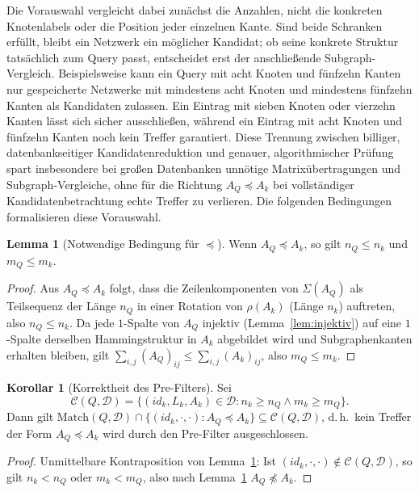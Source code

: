 \documentclass[a4paper,12pt, twoside]{report}
\theoremstyle{definition}
\newtheorem{lemma}{Lemma}
\newtheorem{korollar}{Korollar}
\begin{document}
Die Vorauswahl vergleicht dabei zunächst die Anzahlen, nicht die konkreten Knotenlabels oder die Position jeder einzelnen Kante. Sind beide Schranken erfüllt, bleibt ein Netzwerk ein möglicher Kandidat; ob seine konkrete Struktur tatsächlich zum Query passt, entscheidet erst der anschließende Subgraph-Vergleich. Beispielsweise kann ein Query mit acht Knoten und fünfzehn Kanten nur gespeicherte Netzwerke mit mindestens acht Knoten und mindestens fünfzehn Kanten als Kandidaten zulassen. Ein Eintrag mit sieben Knoten oder vierzehn Kanten lässt sich sicher ausschließen, während ein Eintrag mit acht Knoten und fünfzehn Kanten noch kein Treffer garantiert. Diese Trennung zwischen billiger, datenbankseitiger Kandidatenreduktion und genauer, algorithmischer Prüfung spart insbesondere bei großen Datenbanken unnötige Matrixübertragungen und Subgraph-Vergleiche, ohne für die Richtung $A_Q \preceq A_k$ bei vollständiger Kandidatenbetrachtung echte Treffer zu verlieren. Die folgenden Bedingungen formalisieren diese Vorauswahl.

\begin{lemma}[Notwendige Bedingung für $\preceq$]
	\label{lem:notwendig}
	Wenn $A_Q \preceq A_k$, so gilt $n_Q \le n_k$ und $m_Q \le m_k$.
\end{lemma}

\begin{proof}
	Aus $A_Q \preceq A_k$ folgt, dass die Zeilenkomponenten von $\Sigma(A_Q)$ als Teilsequenz der Länge $n_Q$ in einer Rotation von $\rho(A_k)$ (Länge $n_k$) auftreten, also $n_Q \le n_k$. Da jede $1$-Spalte von $A_Q$ injektiv (Lemma~\ref{lem:injektiv}) auf eine $1$-Spalte derselben Hammingstruktur in $A_k$ abgebildet wird und Subgraphenkanten erhalten bleiben, gilt $\sum_{i,j}(A_Q)_{ij} \le \sum_{i,j}(A_k)_{ij}$, also $m_Q \le m_k$.
\end{proof}

\begin{korollar}[Korrektheit des Pre-Filters]
	\label{kor:prefilter}
	Sei
	\[
	\mathcal{C}(Q,\mathcal{D}) = \{(id_k,L_k,A_k)\in\mathcal{D} : n_k \ge n_Q \wedge m_k \ge m_Q\}.
	\]
	Dann gilt $\mathrm{Match}(Q,\mathcal{D}) \cap \{(id_k,\cdot,\cdot): A_Q \preceq A_k\} \subseteq \mathcal{C}(Q,\mathcal{D})$, d.\,h.\ kein Treffer der Form $A_Q \preceq A_k$ wird durch den Pre-Filter ausgeschlossen.
\end{korollar}

\begin{proof}
	Unmittelbare Kontraposition von Lemma~\ref{lem:notwendig}: Ist $(id_k,\cdot,\cdot) \notin \mathcal{C}(Q,\mathcal{D})$, so gilt $n_k < n_Q$ oder $m_k < m_Q$, also nach Lemma~\ref{lem:notwendig} $A_Q \not\preceq A_k$.
\end{proof}
\end{document}

